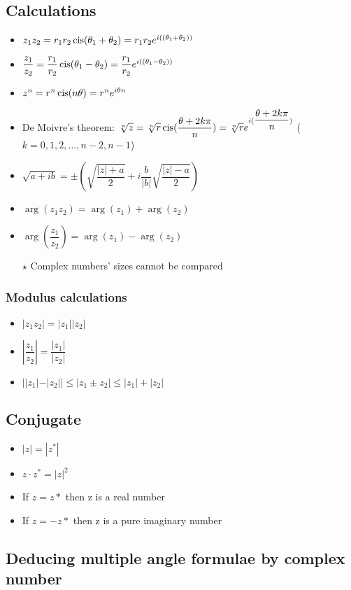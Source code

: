 \subsection{Calculations}
\begin{itemize}
	\item $z_1z_2=r_1r_2\operatorname{cis}(\theta_1+\theta_2)=r_1r_2e^{i((\theta_1+\theta_2))}$
	\item $\dfrac{z_1}{z_2}=\dfrac{r_1}{r_2}\operatorname{cis}(\theta_1-\theta_2)=\dfrac{r_1}{r_2}e^{i((\theta_1-\theta_2))}$
	\item $z^n = r^n\operatorname{cis}(n\theta)=r^ne^{i\theta n}$
	\item De Moivre's theorem: $\sqrt[n]{z}=\sqrt[n]{r}\operatorname{cis}(\dfrac{\theta+2k\pi}{n})=\sqrt[n]{r}e^{i(\dfrac{\theta+2k\pi}{n})}$ ($k=0,1,2,\dots,n-2,n-1$)
	\item $\sqrt{a+ib}=\pm(\sqrt{\dfrac{|z|+a}{2}}+i\dfrac{b}{|b|}\sqrt{\dfrac{|z|-a}{2}})$
	\item $\arg(z_1z_2)=\arg(z_1)+\arg(z_2)$
	\item $\arg(\dfrac{z_1}{z_2})=\arg(z_1)-\arg(z_2)$
	\item[$\star$] Complex numbers' sizes cannot be compared
\end{itemize}
\subsubsection{Modulus calculations}
\begin{itemize}
	\item $|z_1z_2|=|z_1||z_2|$
	\item $|\dfrac{z_1}{z_2}|=\dfrac{|z_1|}{|z_2|}$
	\item $||z_1|-|z_2|| \leq |z_1 \pm z_2| \leq |z_1|+|z_2|$
\end{itemize}


\subsection{Conjugate}
\begin{itemize}
	\item $|z|=|z^*|$
	\item $z\cdot z^*= |z|^2$
	\item If $z=z*$ then z is a real number
	\item If $z=-z*$ then z is a pure imaginary number
\end{itemize}

\subsection{Deducing multiple angle formulae by complex number}

